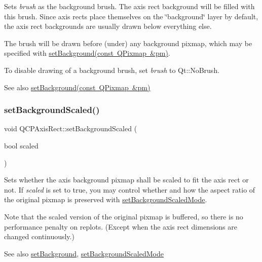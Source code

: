 Sets {\itshape brush} as the background brush. The axis rect background will be filled with this brush. Since axis rects place themselves on the \char`\"{}background\char`\"{} layer by default, the axis rect backgrounds are usually drawn below everything else.

The brush will be drawn before (under) any background pixmap, which may be specified with \mbox{\hyperlink{class_q_c_p_axis_rect_af615ab5e52b8e0a9a0eff415b6559db5}{set\+Background(const Q\+Pixmap \&pm)}}.

To disable drawing of a background brush, set {\itshape brush} to Qt\+::\+No\+Brush.

\begin{DoxySeeAlso}{See also}
\mbox{\hyperlink{class_q_c_p_axis_rect_af615ab5e52b8e0a9a0eff415b6559db5}{set\+Background(const Q\+Pixmap \&pm)}} 
\end{DoxySeeAlso}
\mbox{\label{class_q_c_p_axis_rect_ae6d36c3e0e968ffb991170a018e7b503}} 
\subsubsection{\texorpdfstring{setBackgroundScaled()}{setBackgroundScaled()}}
{\footnotesize\ttfamily void Q\+C\+P\+Axis\+Rect\+::set\+Background\+Scaled (\begin{DoxyParamCaption}\item[{bool}]{scaled }\end{DoxyParamCaption})}

Sets whether the axis background pixmap shall be scaled to fit the axis rect or not. If {\itshape scaled} is set to true, you may control whether and how the aspect ratio of the original pixmap is preserved with \mbox{\hyperlink{class_q_c_p_axis_rect_a5ef77ea829c9de7ba248e473f48f7305}{set\+Background\+Scaled\+Mode}}.

Note that the scaled version of the original pixmap is buffered, so there is no performance penalty on replots. (Except when the axis rect dimensions are changed continuously.)

\begin{DoxySeeAlso}{See also}
\mbox{\hyperlink{class_q_c_p_axis_rect_af615ab5e52b8e0a9a0eff415b6559db5}{set\+Background}}, \mbox{\hyperlink{class_q_c_p_axis_rect_a5ef77ea829c9de7ba248e473f48f7305}{set\+Background\+Scaled\+Mode}} 
\end{DoxySeeAlso}
\mbox{\label{class_q_c_p_axis_rect_a5ef77ea829c9de7ba248e473f48f7305}} 

